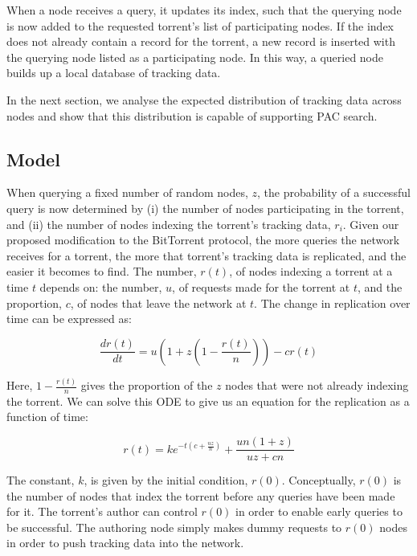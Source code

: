     When a node receives a query, it updates its index, such that the querying node is now added to the requested torrent's list of participating nodes. If the index does not already contain a record for the torrent, a new record is inserted with the querying node listed as a participating node. In this way, a queried node builds up a local database of tracking data.

    In the next section, we analyse the expected distribution of tracking data across nodes and show that this distribution is capable of supporting PAC search.

\subsection{Model}\label{sec:extension:model}

    When querying a fixed number of random nodes, $z$, the probability of a successful query is now determined by (i) the number of nodes participating in the torrent, and (ii) the number of nodes indexing the torrent's tracking data, $r_i$. Given our proposed modification to the BitTorrent protocol, the more queries the network receives for a torrent, the more that torrent's tracking data is replicated, and the easier it becomes to find. The number, $r(t)$, of nodes indexing a torrent at a time $t$ depends on: the number, $u$, of requests made for the torrent at $t$, and the proportion, $c$, of nodes that leave the network at $t$. The change in replication over time can be expressed as:

    \begin{equation}
        \frac{dr(t)}{dt} = u(1+z(1-\frac{r(t)}{n}))-cr(t)
        \label{eq:drdt}
    \end{equation}

    Here, $1-\frac{r(t)}{n}$ gives the proportion of the $z$ nodes that were not already indexing the torrent. We can solve this ODE to give us an equation for the replication as a function of time:

    \begin{equation}
        r(t) = ke^{-t(c+\frac{uz}{n})}+\frac{un(1+z)}{uz+cn}
        \label{eq:rt}
    \end{equation}

    The constant, $k$, is given by the initial condition, $r(0)$. Conceptually, $r(0)$ is the number of nodes that index the torrent before any queries have been made for it. The torrent's author can control $r(0)$ in order to enable early queries to be successful. The authoring node simply makes dummy requests to $r(0)$ nodes in order to push tracking data into the network.

